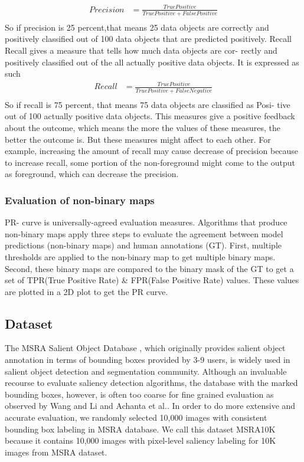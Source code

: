 \begin{align*}
Precision &= \frac{TruePositive}{TruePositive + FalsePositive}\\
 \end{align*}
 So if precision is 25 percent,that means 25 data objects are correctly and positively classified out of 100 data objects that are predicted positively.
Recall Recall gives a measure that tells how much data objects are cor- rectly and positively classified out of the all actually positive data objects. It is expressed as such
\begin{align*}
Recall&=\frac{TruePositive}{TruePositive + FalseNegative}\\
 \end{align*} 
So if recall is 75 percent, that means 75 data objects are classified as Posi- tive out of 100 actually positive data objects. This measures give a positive feedback about the outcome, which means the more the values of these measures, the better the outcome is. But these measures might affect to each other. For example, increasing the amount of recall may cause decrease of precision because to increase recall, some portion of the non-foreground might come to the output as foreground, which can decrease the precision.

\subsubsection{Evaluation of non-binary maps}
PR- curve is
universally-agreed evaluation measures. Algorithms that
produce non-binary maps apply three steps to evaluate the agreement between model predictions (non-binary maps)
and human annotations (GT). First, multiple thresholds are
applied to the non-binary map to get multiple binary maps.
Second, these binary maps are compared to the binary mask
of the GT to get a set of TPR(True Positive Rate) & FPR(False Positive Rate) values. These values
are plotted in a 2D plot to get the PR curve.

\subsection{Dataset}
The  MSRA Salient Object Database \cite{cheng2015global}\cite{SalObjSurvey}\cite{SalObjBenchmark}\cite{13iccv/Cheng_Saliency}, which originally provides salient object annotation in terms of bounding boxes provided by 3-9 users, is widely used in salient object detection and segmentation community. Although an invaluable recourse to evaluate saliency detection algorithms, the database with the marked bounding boxes, however, is often too coarse for fine grained evaluation as observed by Wang and Li  \cite{wang2008two}and Achanta et al.\cite{achanta2010saliency}. In order to do more extensive and accurate evaluation, we randomly selected 10,000 images with consistent bounding box labeling in MSRA database. We call this dataset MSRA10K because it contains 10,000 images with pixel-level saliency labeling for 10K images from MSRA dataset.

